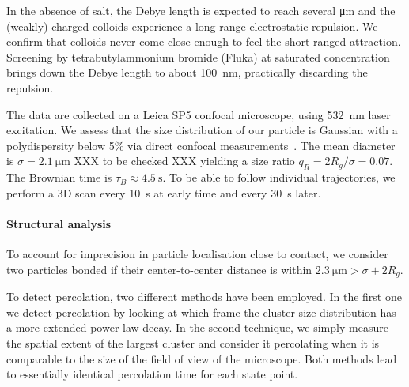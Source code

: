 \documentclass[twocolumn,showpacs,amsmath,amssymb,pre,superscriptaddress]{revtex4}
\begin{document}
In the absence of salt, the Debye length is expected to reach several \si{\micro\metre} and the (weakly) charged colloids experience a long range electrostatic repulsion. We confirm that colloids never come close enough to feel the short-ranged attraction. Screening by tetrabutylammonium bromide (Fluka) at saturated concentration brings down the Debye length to about \SI{100}{\nano\metre}, practically discarding the repulsion.

The data are collected on a Leica SP5 confocal microscope, using \SI{532}{\nano\metre} laser excitation. We assess that the size distribution of our particle is Gaussian with a polydispersity below 5\% via direct confocal measurements~\cite{Leocmach2013}. The mean diameter is $\sigma=\SI{2.1}{\micro\metre}$ XXX to be checked XXX yielding a size ratio $q_R=2R_g/\sigma=0.07$. The Brownian time is $\tau_B \approx \SI{4.5}{\second}$. To be able to follow individual trajectories, we perform a 3D scan every \SI{10}{\second} at early time and every \SI{30}{\second} later.

%

\paragraph*{Structural analysis}
To account for imprecision in particle localisation close to contact, we consider two particles bonded if their center-to-center distance is within $\SI{2.3}{\micro\metre}>\sigma+2R_g$.

To detect percolation, two different methods have been employed. In the first one we detect percolation
by looking at which frame the cluster size distribution has a more extended power-law decay. In the second technique,
we simply measure the spatial extent of the largest cluster and consider it percolating when it is comparable to the
size of the field of view of the microscope. Both methods lead to essentially identical percolation time for each state point.




\clearpage
\end{document}
